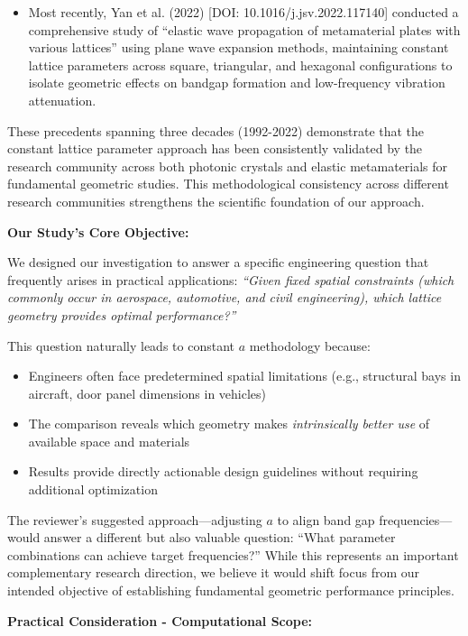 \documentclass[11pt,a4paper]{article}
\newenvironment{responsebox}{%
    \par\medskip\noindent{\color{responsecolor}\rule{\linewidth}{2pt}}\par
    \noindent{\color{responsecolor}\bfseries Response}\par\smallskip
}{%
    \par\noindent{\color{responsecolor}\rule{\linewidth}{0.5pt}}\medskip
}
\begin{document}
\begin{responsebox}
\begin{itemize}
    \item Most recently, Yan et al. (2022) [DOI: 10.1016/j.jsv.2022.117140] conducted a comprehensive study of ``elastic wave propagation of metamaterial plates with various lattices'' using plane wave expansion methods, maintaining constant lattice parameters across square, triangular, and hexagonal configurations to isolate geometric effects on bandgap formation and low-frequency vibration attenuation.
\end{itemize}

These precedents spanning three decades (1992-2022) demonstrate that the constant lattice parameter approach has been consistently validated by the research community across both photonic crystals and elastic metamaterials for fundamental geometric studies. This methodological consistency across different research communities strengthens the scientific foundation of our approach.

\textbf{Our Study's Core Objective:}

We designed our investigation to answer a specific engineering question that frequently arises in practical applications: \textit{``Given fixed spatial constraints (which commonly occur in aerospace, automotive, and civil engineering), which lattice geometry provides optimal performance?''}

This question naturally leads to constant $a$ methodology because:

\begin{itemize}
    \item Engineers often face predetermined spatial limitations (e.g., structural bays in aircraft, door panel dimensions in vehicles)
    \item The comparison reveals which geometry makes \textit{intrinsically better use} of available space and materials
    \item Results provide directly actionable design guidelines without requiring additional optimization
\end{itemize}

The reviewer's suggested approach---adjusting $a$ to align band gap frequencies---would answer a different but also valuable question: ``What parameter combinations can achieve target frequencies?'' While this represents an important complementary research direction, we believe it would shift focus from our intended objective of establishing fundamental geometric performance principles.

\textbf{Practical Consideration - Computational Scope:}


\end{responsebox}
\end{document}
